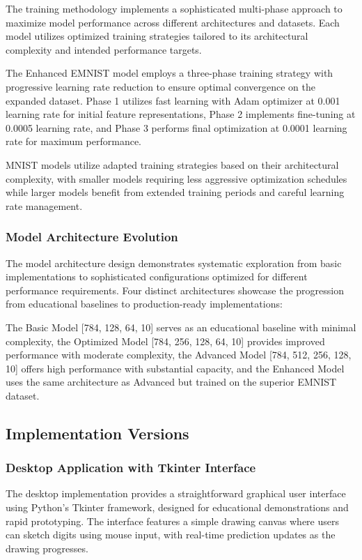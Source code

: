 \documentclass[11pt,a4paper]{report}
\begin{document}
The training methodology implements a sophisticated multi-phase approach to maximize model performance across different architectures and datasets. Each model utilizes optimized training strategies tailored to its architectural complexity and intended performance targets.

The Enhanced EMNIST model employs a three-phase training strategy with progressive learning rate reduction to ensure optimal convergence on the expanded dataset. Phase 1 utilizes fast learning with Adam optimizer at 0.001 learning rate for initial feature representations, Phase 2 implements fine-tuning at 0.0005 learning rate, and Phase 3 performs final optimization at 0.0001 learning rate for maximum performance.

MNIST models utilize adapted training strategies based on their architectural complexity, with smaller models requiring less aggressive optimization schedules while larger models benefit from extended training periods and careful learning rate management.

\subsubsection{Model Architecture Evolution}

The model architecture design demonstrates systematic exploration from basic implementations to sophisticated configurations optimized for different performance requirements. Four distinct architectures showcase the progression from educational baselines to production-ready implementations:

The Basic Model [784, 128, 64, 10] serves as an educational baseline with minimal complexity, the Optimized Model [784, 256, 128, 64, 10] provides improved performance with moderate complexity, the Advanced Model [784, 512, 256, 128, 10] offers high performance with substantial capacity, and the Enhanced Model uses the same architecture as Advanced but trained on the superior EMNIST dataset.

\subsection{Implementation Versions}

\subsubsection{Desktop Application with Tkinter Interface}

The desktop implementation provides a straightforward graphical user interface using Python's Tkinter framework, designed for educational demonstrations and rapid prototyping. The interface features a simple drawing canvas where users can sketch digits using mouse input, with real-time prediction updates as the drawing progresses.
\end{document}
